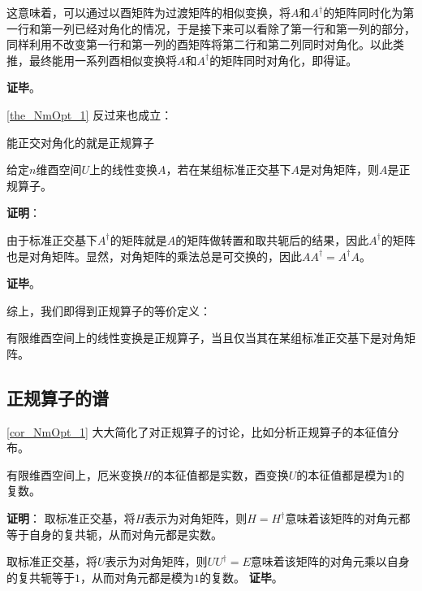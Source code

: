 这意味着，可以通过以酉矩阵为过渡矩阵的相似变换，将$A$和$A^\dagger$的矩阵同时化为第一行和第一列已经对角化的情况，于是接下来可以看除了第一行和第一列的部分，同样利用不改变第一行和第一列的酉矩阵将第二行和第二列同时对角化。以此类推，最终能用一系列酉相似变换将$A$和$A^\dagger$的矩阵同时对角化，即得证。

\textbf{证毕}。


\autoref{the_NmOpt_1} 反过来也成立：


\begin{theorem}{能正交对角化的就是正规算子}

给定$n$维酉空间$U$上的线性变换$A$，若在某组标准正交基下$A$是对角矩阵，则$A$是正规算子。

\end{theorem}

\textbf{证明}：

由于标准正交基下$A^\dagger$的矩阵就是$A$的矩阵做转置和取共轭后的结果，因此$A^\dagger$的矩阵也是对角矩阵。显然，对角矩阵的乘法总是可交换的，因此$AA^\dagger = A^\dagger A$。

\textbf{证毕}。


综上，我们即得到正规算子的等价定义：


\begin{corollary}{}
有限维酉空间上的线性变换是正规算子，当且仅当其在某组标准正交基下是对角矩阵。
\end{corollary}

\subsection{正规算子的谱}
\autoref{cor_NmOpt_1} 大大简化了对正规算子的讨论，比如分析正规算子的本征值分布。

\begin{theorem}{}
有限维酉空间上，厄米变换$H$的本征值都是实数，酉变换$U$的本征值都是模为$1$的复数。
\end{theorem}

\textbf{证明}：
取标准正交基，将$H$表示为对角矩阵，则$H=H^\dagger$意味着该矩阵的对角元都等于自身的复共轭，从而对角元都是实数。

取标准正交基，将$U$表示为对角矩阵，则$UU^\dagger = E$意味着该矩阵的对角元乘以自身的复共轭等于$1$，从而对角元都是模为$1$的复数。
\textbf{证毕}。
